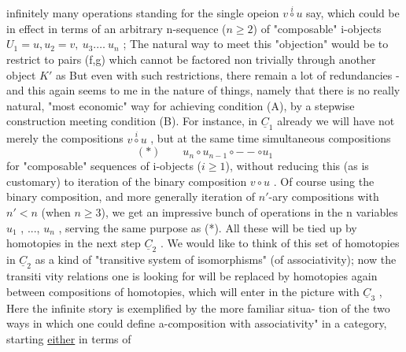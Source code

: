 infinitely many operations standing for the single opeion $v\overset{i}{\circ}u$ say,
which could be  in effect in terms of an arbitrary n-sequence
($n\geqslant 2$) of "composable" i-objects $U_1=u,u_2=v,\ u_3.\dots\ u_n$ ; The natural
way to meet this "objection" would be to restrict to  pairs (f,g)
which cannot be factored non trivially through another object $K'$ as
But even with such restrictions, there remain a lot of redundancies
- and this again seems to me in the nature of things, namely that there
is no really natural, "most economic" way for achieving condition (A),
by a stepwise construction meeting condition (B). For instance, in $\underline{C}_1$
already we will have  not merely the compositions $v\overset{i}{\circ}u$ , but at the
same time simultaneous compositions
\[ (*) \qquad u_n\circ u_{n-1}\circ - - \circ u_1 \]
for "composable" sequences of i-objects ($i\geqslant 1$), without reducing this
(as is customary) to iteration of the binary composition $v\circ u$ . Of course
using the binary composition, and more generally iteration of $n'$-ary
compositions with $n'<n$ (when $n\geqslant 3$), we get an impressive bunch of
operations in the n variables $u_1$ , ..., $u_n$ , serving the same purpose
as (*). All these will be tied up by homotopies in the next step $\underline{C}_2$ .
We would like to think of this set of homotopies in $\underline{C}_2$ as a kind of
"transitive system of isomorphisms" (of associativity); now the transiti%
vity relations one is looking for will be replaced by homotopies again
between compositions of homotopies, which will enter in the picture with
$\underline{C}_3$ , Here the infinite story is exemplified by the more familiar situa-%
\margin{$\otimes$} tion of the two ways in which one could define a\hand{$\otimes$}-composition with
associativity" in a category,  starting \uline{either} in terms of
